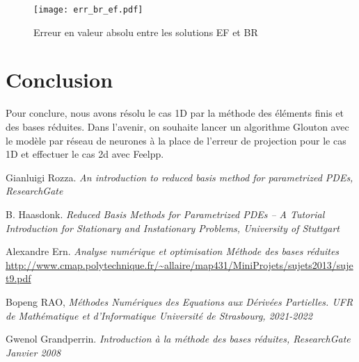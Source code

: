 \documentclass[12pt]{article}
\begin{document}
\begin{figure}[H]
\begin{center}
\texttt{[image: err\_br\_ef.pdf]}
\caption[]{Erreur  en valeur absolu entre les solutions EF et BR }
\end{center}
\label{fig:3}
\end{figure}


\section{Conclusion}

Pour conclure, nous avons résolu le cas 1D par la méthode des éléments finis et des bases réduites. Dans l'avenir, on souhaite lancer un algorithme Glouton avec le modèle par réseau de neurones à la place de l'erreur de projection pour le cas 1D et effectuer le cas 2d avec Feelpp.








\begin{thebibliography}{9}

Gianluigi Rozza.  \emph{An introduction to reduced basis method for parametrized PDEs, ResearchGate}

B. Haasdonk.  \emph{Reduced Basis Methods for Parametrized PDEs –
A Tutorial Introduction for Stationary and
Instationary Problems, University of Stuttgart  } 


Alexandre Ern.  \emph{ Analyse numérique et optimisation Méthode des bases réduites }\url{http://www.cmap.polytechnique.fr/~allaire/map431/MiniProjets/sujets2013/sujet9.pdf}

Bopeng RAO,  \emph{ Méthodes Numériques
des Equations aux Dérivées Partielles. UFR de Mathématique et d’Informatique
Université de Strasbourg, 2021-2022 }

Gwenol Grandperrin.  \emph{Introduction à la méthode des bases réduites, ResearchGate Janvier 2008 }

\end{thebibliography}
\end{document}
